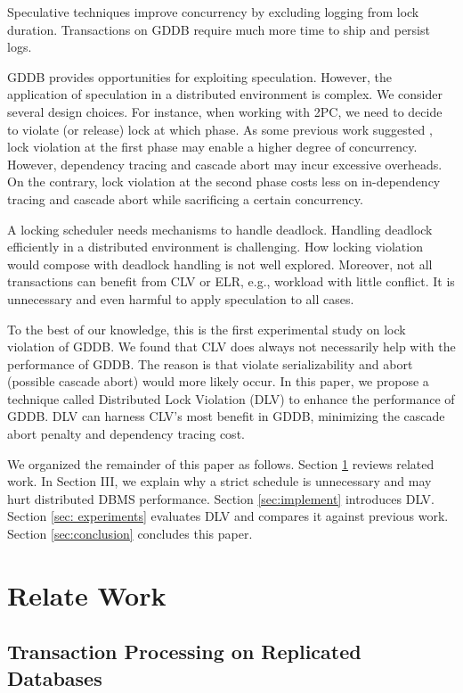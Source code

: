 \documentclass[conference]{IEEEtran}
\begin{document}
Speculative techniques improve concurrency by excluding logging from lock duration.
Transactions on GDDB require much more time to ship and persist logs.

GDDB provides opportunities for exploiting speculation.
However, the application of speculation in a distributed environment is complex.
We consider several design choices.
For instance, when working with 2PC, we need to decide to violate (or release) lock at which phase.
As some previous work suggested \cite{CLV:conf/sigmod/GraefeLKTV13}, lock violation at the first phase may enable a higher degree of concurrency.
However, dependency tracing and cascade abort may incur excessive overheads.
On the contrary, lock violation at the second phase costs less on in-dependency tracing and cascade abort while sacrificing a certain concurrency.

A locking scheduler needs mechanisms to handle deadlock.
Handling deadlock efficiently in a distributed environment is challenging.
How locking violation would compose with deadlock handling is not well explored.
Moreover, not all transactions can benefit from CLV or ELR, e.g., workload with little conflict.
It is unnecessary and even harmful to apply speculation to all cases.


To the best of our knowledge, this is the first experimental study on lock violation of GDDB.
We found that CLV does always not necessarily help with the performance of GDDB.
The reason is that violate serializability and abort (possible cascade abort) would more likely occur.
In this paper, we propose a technique called Distributed Lock Violation (DLV) to enhance the performance of GDDB.
DLV can harness CLV's most benefit in GDDB, minimizing the cascade abort penalty and dependency tracing cost.

We organized the remainder of this paper as follows.
Section \ref{sec:relate_work} reviews related work.
In Section III, we explain why a strict schedule is unnecessary and may hurt distributed DBMS performance.
Section \ref{sec:implement} introduces DLV.
Section \ref{sec: experiments} evaluates DLV and compares it against previous work.
Section \ref{sec:conclusion} concludes this paper.


\section{Relate Work}
\label{sec:relate_work}

\subsection{Transaction Processing on Replicated Databases}
\end{document}
